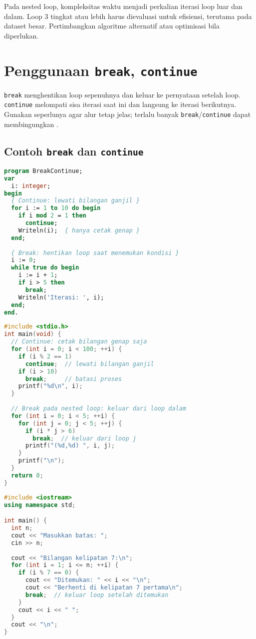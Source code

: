 \documentclass[../main.tex]{subfiles}
\begin{document}
Pada nested loop, kompleksitas waktu menjadi perkalian iterasi loop luar dan dalam. Loop 3 tingkat atau lebih harus dievaluasi untuk efisiensi, terutama pada dataset besar. Pertimbangkan algoritme alternatif atau optimisasi bila diperlukan.

\section{Penggunaan \texttt{break}, \texttt{continue}}
\texttt{break} menghentikan loop sepenuhnya dan keluar ke pernyataan setelah loop. \texttt{continue} melompati sisa iterasi saat ini dan langsung ke iterasi berikutnya. Gunakan seperlunya agar alur tetap jelas; terlalu banyak \texttt{break}/\texttt{continue} dapat membingungkan \parencite{gnu-c-manual,cpp-reference}.

\subsection{Contoh \texttt{break} dan \texttt{continue}}
\begin{lstlisting}[language=Pascal, caption={break dan continue di Pascal}]
program BreakContinue;
var
  i: integer;
begin
  { Continue: lewati bilangan ganjil }
  for i := 1 to 10 do begin
    if i mod 2 = 1 then
      continue;
    Writeln(i);  { hanya cetak genap }
  end;
  
  { Break: hentikan loop saat menemukan kondisi }
  i := 0;
  while true do begin
    i := i + 1;
    if i > 5 then
      break;
    Writeln('Iterasi: ', i);
  end;
end.
\end{lstlisting}

\begin{lstlisting}[language=C, caption={break dan continue di C}]
#include <stdio.h>
int main(void) {
  // Continue: cetak bilangan genap saja
  for (int i = 0; i < 100; ++i) {
    if (i % 2 == 1)
      continue;  // lewati bilangan ganjil
    if (i > 10)
      break;     // batasi proses
    printf("%d\n", i);
  }
  
  // Break pada nested loop: keluar dari loop dalam
  for (int i = 0; i < 5; ++i) {
    for (int j = 0; j < 5; ++j) {
      if (i * j > 6)
        break;  // keluar dari loop j
      printf("(%d,%d) ", i, j);
    }
    printf("\n");
  }
  return 0;
}
\end{lstlisting}

\begin{lstlisting}[language=C++, caption={break saat menemukan kondisi (C++)}]
#include <iostream>
using namespace std;

int main() {
  int n;
  cout << "Masukkan batas: ";
  cin >> n;
  
  cout << "Bilangan kelipatan 7:\n";
  for (int i = 1; i <= n; ++i) {
    if (i % 7 == 0) {
      cout << "Ditemukan: " << i << "\n";
      cout << "Berhenti di kelipatan 7 pertama\n";
      break;  // keluar loop setelah ditemukan
    }
    cout << i << " ";
  }
  cout << "\n";
}
\end{lstlisting}
\end{document}
